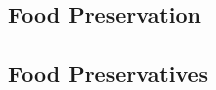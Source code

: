 \begin{multicols}{2}
%
%


\section*{Food Preservation} 


\subsection{Food Preservatives} %



\end{multicols}
